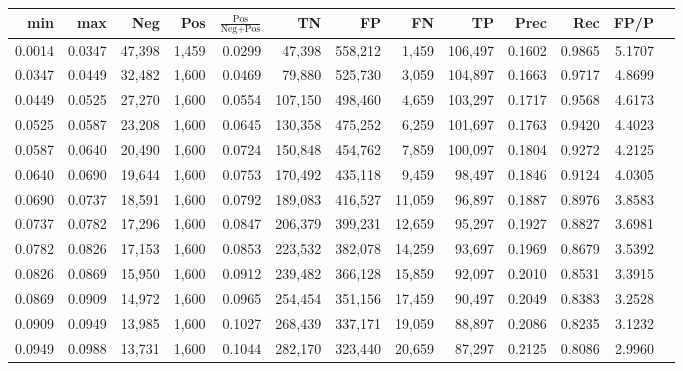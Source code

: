 \begin{tabular}{rrrrrrrrrrrrr}
\toprule
   min &    max &    Neg &   Pos & $\frac{\text{Pos}}{\text{Neg}+\text{Pos}}$ &      TN &      FP &      FN &      TP &   Prec &    Rec &   FP/P \\
\midrule
0.0014 & 0.0347 & 47,398 & 1,459 &                                     0.0299 &  47,398 & 558,212 &   1,459 & 106,497 & 0.1602 & 0.9865 & 5.1707 \\
0.0347 & 0.0449 & 32,482 & 1,600 &                                     0.0469 &  79,880 & 525,730 &   3,059 & 104,897 & 0.1663 & 0.9717 & 4.8699 \\
0.0449 & 0.0525 & 27,270 & 1,600 &                                     0.0554 & 107,150 & 498,460 &   4,659 & 103,297 & 0.1717 & 0.9568 & 4.6173 \\
0.0525 & 0.0587 & 23,208 & 1,600 &                                     0.0645 & 130,358 & 475,252 &   6,259 & 101,697 & 0.1763 & 0.9420 & 4.4023 \\
0.0587 & 0.0640 & 20,490 & 1,600 &                                     0.0724 & 150,848 & 454,762 &   7,859 & 100,097 & 0.1804 & 0.9272 & 4.2125 \\
0.0640 & 0.0690 & 19,644 & 1,600 &                                     0.0753 & 170,492 & 435,118 &   9,459 &  98,497 & 0.1846 & 0.9124 & 4.0305 \\
0.0690 & 0.0737 & 18,591 & 1,600 &                                     0.0792 & 189,083 & 416,527 &  11,059 &  96,897 & 0.1887 & 0.8976 & 3.8583 \\
0.0737 & 0.0782 & 17,296 & 1,600 &                                     0.0847 & 206,379 & 399,231 &  12,659 &  95,297 & 0.1927 & 0.8827 & 3.6981 \\
0.0782 & 0.0826 & 17,153 & 1,600 &                                     0.0853 & 223,532 & 382,078 &  14,259 &  93,697 & 0.1969 & 0.8679 & 3.5392 \\
0.0826 & 0.0869 & 15,950 & 1,600 &                                     0.0912 & 239,482 & 366,128 &  15,859 &  92,097 & 0.2010 & 0.8531 & 3.3915 \\
0.0869 & 0.0909 & 14,972 & 1,600 &                                     0.0965 & 254,454 & 351,156 &  17,459 &  90,497 & 0.2049 & 0.8383 & 3.2528 \\
0.0909 & 0.0949 & 13,985 & 1,600 &                                     0.1027 & 268,439 & 337,171 &  19,059 &  88,897 & 0.2086 & 0.8235 & 3.1232 \\
0.0949 & 0.0988 & 13,731 & 1,600 &                                     0.1044 & 282,170 & 323,440 &  20,659 &  87,297 & 0.2125 & 0.8086 & 2.9960 \\

\end{tabular}
